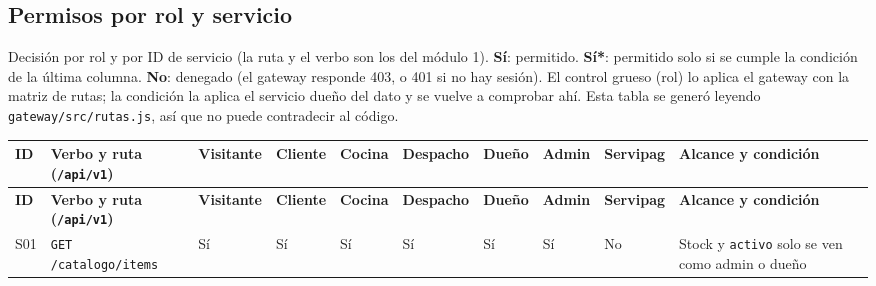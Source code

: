 \begin{landscape}
\subsection{Permisos por rol y servicio}
Decisión por rol y por ID de servicio (la ruta y el verbo son los del módulo 1). \textbf{Sí}: permitido. \textbf{Sí*}: permitido solo si se cumple la condición de la última columna. \textbf{No}: denegado (el gateway responde 403, o 401 si no hay sesión). El control grueso (rol) lo aplica el gateway con la matriz de rutas; la condición la aplica el servicio dueño del dato y se vuelve a comprobar ahí. Esta tabla se generó leyendo \texttt{gateway/\allowbreak{}src/\allowbreak{}rutas.\allowbreak{}js}, así que no puede contradecir al código.

\vspace{0.6em}
{\scriptsize
\setlength{\LTpre}{0pt}\setlength{\LTpost}{0pt}
\setlength{\tabcolsep}{3pt}\renewcommand{\arraystretch}{1.15}
\begin{longtable}{|>{\raggedright\arraybackslash}p{}|>{\raggedright\arraybackslash}p{}|>{\raggedright\arraybackslash}p{}|>{\raggedright\arraybackslash}p{}|>{\raggedright\arraybackslash}p{}|>{\raggedright\arraybackslash}p{}|>{\raggedright\arraybackslash}p{}|>{\raggedright\arraybackslash}p{}|>{\raggedright\arraybackslash}p{}|>{\raggedright\arraybackslash}p{}|}
\hline
\textbf{ID} & \textbf{Verbo y ruta (\texttt{/\allowbreak{}api/\allowbreak{}v1})} & \textbf{Visitante} & \textbf{Cliente} & \textbf{Cocina} & \textbf{Despacho} & \textbf{Dueño} & \textbf{Admin} & \textbf{Servipag} & \textbf{Alcance y condición} \\ \hline
\endfirsthead
\hline
\textbf{ID} & \textbf{Verbo y ruta (\texttt{/\allowbreak{}api/\allowbreak{}v1})} & \textbf{Visitante} & \textbf{Cliente} & \textbf{Cocina} & \textbf{Despacho} & \textbf{Dueño} & \textbf{Admin} & \textbf{Servipag} & \textbf{Alcance y condición} \\ \hline
\endhead
S01 & \texttt{GET /\allowbreak{}catalogo/\allowbreak{}items} & Sí & Sí & Sí & Sí & Sí & Sí & No & Stock y \texttt{activo} solo se ven como admin o dueño \\ \hline

\end{longtable}}
\end{landscape}
